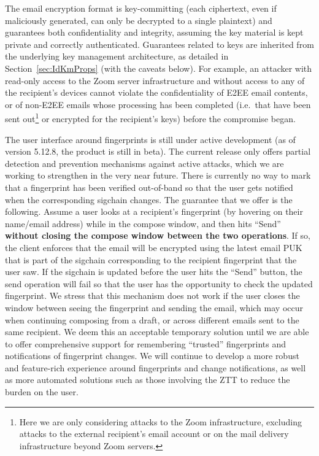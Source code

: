 The email encryption format is key-committing (each ciphertext, even if maliciously generated, can
only be decrypted to a single plaintext) and guarantees both confidentiality and integrity, assuming
the key material is kept private and correctly authenticated. Guarantees related to keys are
inherited from the underlying key management architecture, as detailed in
Section~\ref{sec:IdKmProps} (with the caveats below). For example, an attacker with read-only access
to the Zoom server infrastructure and without access to any of the recipient's devices cannot
violate the confidentiality of E2EE email contents, or of non-E2EE emails whose processing has been
completed (i.e.\ that have been sent out\footnote{Here we are only considering attacks to the Zoom
infrastructure, excluding attacks to the external recipient's email account or on the mail delivery
infrastructure beyond Zoom servers.} or encrypted for the recipient's keys) before the compromise
began.

The user interface around fingerprints is still under active development (as of version 5.12.8, the
product is still in beta). The current release only offers partial detection and prevention
mechanisms against active attacks, which we are working to strengthen in the very near future. There
is currently no way to mark that a fingerprint has been verified out-of-band so that the user gets
notified when the corresponding sigchain changes. The guarantee that we offer is the following.
Assume a user looks at a recipient's fingerprint (by hovering on their name/email address) while in
the compose window, and then hits ``Send'' \textbf{without closing the compose window between the
two operations}. If so, the client enforces that the email will be encrypted using the latest email
PUK that is part of the sigchain corresponding to the recipient fingerprint that the user saw. If
the sigchain is updated before the user hits the ``Send'' button, the send operation will fail so
that the user has the opportunity to check the updated fingerprint. We stress that this mechanism
does not work if the user closes the window between seeing the fingerprint and sending the email,
which may occur when continuing composing from a draft, or across different emails sent to the same
recipient. We deem this an acceptable temporary solution until we are able to offer comprehensive
support for remembering ``trusted'' fingerprints and notifications of fingerprint changes. We will
continue to develop a more robust and feature-rich experience around fingerprints and change
notifications, as well as more automated solutions such as those involving the ZTT to reduce the
burden on the user.

